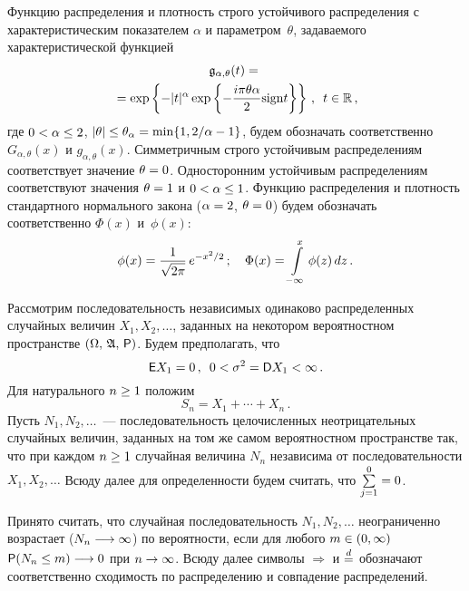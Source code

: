 \vspace*{4pt}


      \thispagestyle{headings}

      \begin{multicols}{2}

            \label{st\stat}



Функцию распределения и плотность строго устойчивого распределения с
характеристическим показателем $\alpha$ и параметром~$\theta$,
задаваемого характеристической функцией
\begin{multline}
\mathfrak{g}_{\alpha,\theta}(t)={}\\
{}=\exp\left\{-|t|^{\alpha}\exp\left\{
-\displaystyle\frac{\displaystyle i\pi\theta\alpha\mathstrut}{\displaystyle 2\mathstrut}\mathrm{sign}t\right\}\right\}\,,\enskip
t\in\mathbb{R}\,,\label{e1-kor}
\end{multline}
где $0<\alpha\hm\le2$,
$|\theta|\hm\le\theta_{\alpha}\hm=\min\{1,{2}/{\alpha}-1\}$, будем обозначать 
соответственно $G_{\alpha,\theta}(x)$ и $g_{\alpha,\theta}(x)$. Симметричным 
строго устойчивым распределениям соответствует значение $\theta\hm=0$. 
Односторонним устойчивым распределениям соответствуют значения $\theta\hm=1$ и 
$0\hm<\alpha\hm\le1$. Функцию распределения и плотность стандартного 
нормального закона ($\alpha\hm=2$, $\theta\hm=0$) будем обозначать 
соответственно $\Phi(x)$ и~$\phi(x)$:
$$
\phi(x)=\displaystyle\frac{\displaystyle 1\mathstrut}{\displaystyle \sqrt{2\pi}\mathstrut}\,e^{-x^2/2}\,;\quad
\Phi(x)=\int\limits_{-\infty}^x\phi(z)\,dz\,.
$$

Рассмотрим последовательность независимых одинаково распределенных
случайных величин $X_1,X_2,\ldots$, заданных на некотором
вероятностном пространстве $(\Omega,\, \mathfrak{A},\,{\sf P})$.
Будем предполагать, что
\begin{equation*}
{\sf E}X_1=0\,, \enskip 0<\sigma^2={\sf D}X_1<\infty\,. %
\end{equation*}
Для натурального $n\hm\ge1$ положим
$$
S_n=X_1+\cdots+X_n\,.
$$
Пусть $N_1,N_2,\ldots$~--- последовательность це\-ло\-чис\-лен\-ных 
неотрицательных случайных величин, заданных на том же самом вероятностном 
пространстве так, что при каждом $n\hm\ge1$ случайная величина $N_n$ независима 
от последовательности $X_1,X_2,\ldots$ Всюду далее для определенности будем 
считать, что $\sum\limits_{j=1}^0\hm=0$.

Принято считать, что случайная последовательность $N_1,N_2,\ldots$
неограниченно возрастает ($N_n\hm\longrightarrow\infty$) по
вероятности, если для любого $m\hm\in(0,\infty)$ ${\sf P}(N_n\hm\le
m)\longrightarrow 0$ при $n\hm\to\infty$. Всюду далее символы
$\Longrightarrow$ и $\stackrel{d}{=}$ обозначают соответственно сходимость по
распределению и совпадение распределений.


\end{multicols}
